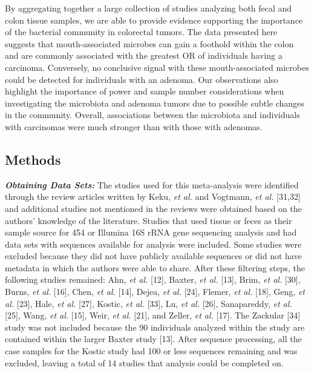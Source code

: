\documentclass[12pt,]{article}
\begin{document}
By aggregating together a large collection of studies analyzing both
fecal and colon tissue samples, we are able to provide evidence
supporting the importance of the bacterial community in colorectal
tumors. The data presented here suggests that mouth-associated microbes
can gain a foothold within the colon and are commonly associated with
the greatest OR of individuals having a carcinoma. Conversely, no
conclusive signal with these mouth-associated microbes could be detected
for individuals with an adenoma. Our observations also highlight the
importance of power and sample number considerations when investigating
the microbiota and adenoma tumors due to possible subtle changes in the
community. Overall, associations between the microbiota and individuals
with carcinomas were much stronger than with those with adenomas.

\newpage

\subsection{Methods}\label{methods}

\textbf{\emph{Obtaining Data Sets:}} The studies used for this
meta-analysis were identified through the review articles written by
Keku, \emph{et al.} and Vogtmann, \emph{et al.} {[}31,32{]} and
additional studies not mentioned in the reviews were obtained based on
the authors' knowledge of the literature. Studies that used tissue or
feces as their sample source for 454 or Illumina 16S rRNA gene
sequencing analysis and had data sets with sequences available for
analysis were included. Some studies were excluded because they did not
have publicly available sequences or did not have metadata in which the
authors were able to share. After these filtering steps, the following
studies remained: Ahn, \emph{et al.} {[}12{]}, Baxter, \emph{et al.}
{[}13{]}, Brim, \emph{et al.} {[}30{]}, Burns, \emph{et al.} {[}16{]},
Chen, \emph{et al.} {[}14{]}, Dejea, \emph{et al.} {[}24{]}, Flemer,
\emph{et al.} {[}18{]}, Geng, \emph{et al.} {[}23{]}, Hale, \emph{et
al.} {[}27{]}, Kostic, \emph{et al.} {[}33{]}, Lu, \emph{et al.}
{[}26{]}, Sanapareddy, \emph{et al.} {[}25{]}, Wang, \emph{et al.}
{[}15{]}, Weir, \emph{et al.} {[}21{]}, and Zeller, \emph{et al.}
{[}17{]}. The Zackular {[}34{]} study was not included because the 90
individuals analyzed within the study are contained within the larger
Baxter study {[}13{]}. After sequence processing, all the case samples
for the Kostic study had 100 or less sequences remaining and was
excluded, leaving a total of 14 studies that analysis could be completed
on.
\end{document}

